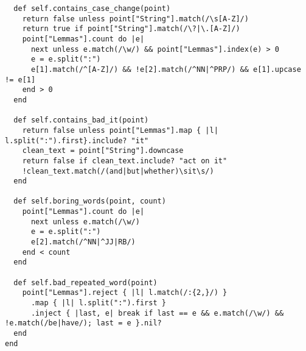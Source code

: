 \documentclass{article}
\begin{document}
\begin{verbatim}
  def self.contains_case_change(point)
    return false unless point["String"].match(/\s[A-Z]/)
    return true if point["String"].match(/\?|\.[A-Z]/)
    point["Lemmas"].count do |e|
      next unless e.match(/\w/) && point["Lemmas"].index(e) > 0
      e = e.split(":")
      e[1].match(/^[A-Z]/) && !e[2].match(/^NN|^PRP/) && e[1].upcase != e[1]
    end > 0
  end

  def self.contains_bad_it(point)
    return false unless point["Lemmas"].map { |l| l.split(":").first}.include? "it"
    clean_text = point["String"].downcase
    return false if clean_text.include? "act on it"
    !clean_text.match(/(and|but|whether)\sit\s/)
  end

  def self.boring_words(point, count)
    point["Lemmas"].count do |e|
      next unless e.match(/\w/)
      e = e.split(":")
      e[2].match(/^NN|^JJ|RB/)
    end < count
  end

  def self.bad_repeated_word(point)
    point["Lemmas"].reject { |l| l.match(/:{2,}/) }
      .map { |l| l.split(":").first }
      .inject { |last, e| break if last == e && e.match(/\w/) && !e.match(/be|have/); last = e }.nil?
  end
end


\end{verbatim}
\pagebreak
\end{document}
